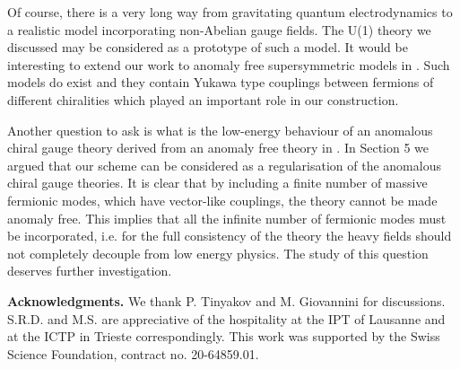 \documentclass[a4paper,12pt]{article}
\begin{document}
Of course, there is a very long way from gravitating quantum
electrodynamics to a realistic model incorporating non-Abelian gauge
fields. The U(1) theory we discussed may be considered as a prototype
of such a model. It would be interesting to extend our work to
anomaly free supersymmetric models in \coordHE{}.  Such models do exist
\cite{Randjbar-Daemi:wc} and they contain Yukawa type couplings
between fermions of different chiralities which played an important
role in our construction.

Another question to ask is what is the low-energy behaviour of an
anomalous \coordHE{}  chiral gauge theory derived from an anomaly free
theory in \coordHE{}. In Section 5 we argued that our scheme can be
considered as a regularisation of the anomalous \coordHE{} chiral gauge
theories. It is clear that by including a finite number of massive
fermionic modes, which have vector-like couplings, the theory cannot
be made anomaly free. This implies that all the infinite number of
fermionic modes must be incorporated, i.e. for the full consistency
of the theory the heavy fields should not completely decouple from
low energy physics. The study of this question deserves further
investigation.


{\bf Acknowledgments.}  We thank P. Tinyakov and M.
Giovannini for discussions. S.R.D. and M.S. are appreciative of the
hospitality at the IPT of Lausanne and at the ICTP in Trieste
correspondingly. This work was supported by the Swiss Science
Foundation, contract no. 20-64859.01. 
\end{document}
